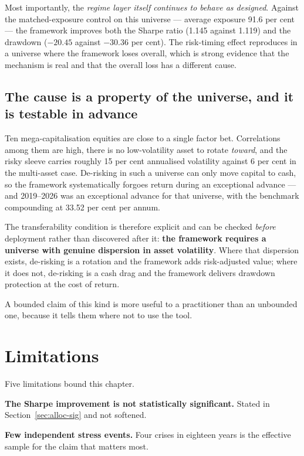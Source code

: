 Most importantly, the \emph{regime layer itself continues to behave as designed}. Against the
matched-exposure control on this universe --- average exposure 91.6 per cent --- the framework
improves both the Sharpe ratio (1.145 against 1.119) and the drawdown ($-20.45$ against $-30.36$
per cent). The risk-timing effect reproduces in a universe where the framework loses overall,
which is strong evidence that the mechanism is real and that the overall loss has a different
cause.

\subsection{The cause is a property of the universe, and it is testable in advance}

Ten mega-capitalisation equities are close to a single factor bet. Correlations among them are
high, there is no low-volatility asset to rotate \emph{toward}, and the risky sleeve carries
roughly 15 per cent annualised volatility against 6 per cent in the multi-asset case. De-risking
in such a universe can only move capital to cash, so the framework systematically forgoes return
during an exceptional advance --- and 2019--2026 was an exceptional advance for that universe,
with the benchmark compounding at 33.52 per cent per annum.

The transferability condition is therefore explicit and can be checked \emph{before} deployment
rather than discovered after it: \textbf{the framework requires a universe with genuine dispersion
in asset volatility}. Where that dispersion exists, de-risking is a rotation and the framework
adds risk-adjusted value; where it does not, de-risking is a cash drag and the framework delivers
drawdown protection at the cost of return.

A bounded claim of this kind is more useful to a practitioner than an unbounded one, because it
tells them where not to use the tool.

\section{Limitations}
\label{sec:alloc-limits}

Five limitations bound this chapter.

\textbf{The Sharpe improvement is not statistically significant.} Stated in
Section~\ref{sec:alloc-sig} and not softened.

\textbf{Few independent stress events.} Four crises in eighteen years is the effective sample for
the claim that matters most.

